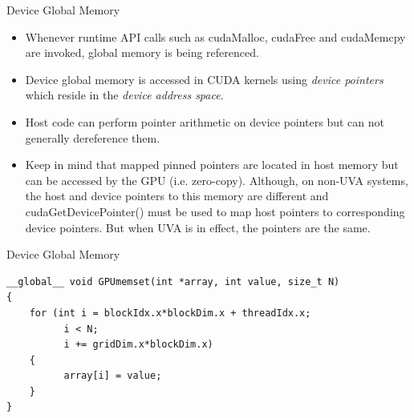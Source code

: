 \documentclass[handout]{beamer}
\begin{document}
\begin{frame}{Device Global Memory}
\begin{itemize}
	\item<1->Whenever runtime API calls such as {\selectfont cudaMalloc}, {\selectfont cudaFree} and {\selectfont cudaMemcpy} are invoked, global memory is being referenced.
	\item<1->Device global memory is accessed in CUDA kernels using \emph{device pointers} which reside in the \emph{device address space}.  
	\item<1->Host code can perform pointer arithmetic on device pointers but can not generally dereference them.  
	\item<1->Keep in mind that mapped pinned pointers are located in host memory but can be accessed by the GPU (i.e. zero-copy).  Although, on non-UVA systems, the host and device pointers to this memory are different and {\selectfont cudaGetDevicePointer()} must be used to map host pointers to corresponding device pointers.  But when UVA is in effect, the pointers are the same.
\end{itemize}
\end{frame}


\begin{frame}[fragile]{Device Global Memory}
\begin{lstlisting}[caption={Device global memory accessed by CUDA kernel using device pointer.  This kernel writes the integer {\fontfamily{qcr}\selectfont value} into the address range given by {\fontfamily{qcr}\selectfont array} and {\fontfamily{qcr}\selectfont N}.  The references to {\fontfamily{qcr}\selectfont blockIdx}, {\fontfamily{qcr}\selectfont blockDim} and {\fontfamily{qcr}\selectfont gridDim} enable the kernel to operate correctly for each individual thread with whatever block and grid parameters were used in the kernel launch.}] 
__global__ void GPUmemset(int *array, int value, size_t N)
{
    for (int i = blockIdx.x*blockDim.x + threadIdx.x;
          i < N;
          i += gridDim.x*blockDim.x)
    {
          array[i] = value;
    }
}
\end{lstlisting}
\end{frame}
\end{document}
